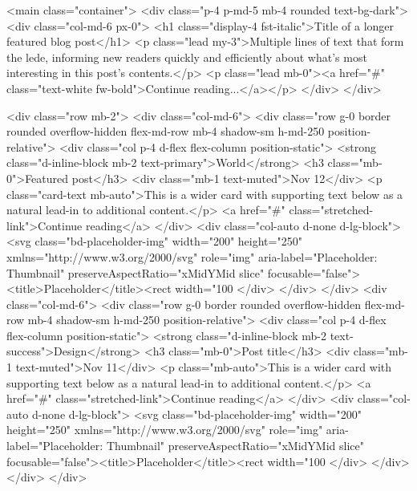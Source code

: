 <main class="container">
  <div class="p-4 p-md-5 mb-4 rounded text-bg-dark">
    <div class="col-md-6 px-0">
      <h1 class="display-4 fst-italic">Title of a longer featured blog post</h1>
      <p class="lead my-3">Multiple lines of text that form the lede, informing new readers quickly and efficiently about what’s most interesting in this post’s contents.</p>
      <p class="lead mb-0"><a href="#" class="text-white fw-bold">Continue reading...</a></p>
    </div>
  </div>

  <div class="row mb-2">
    <div class="col-md-6">
      <div class="row g-0 border rounded overflow-hidden flex-md-row mb-4 shadow-sm h-md-250 position-relative">
        <div class="col p-4 d-flex flex-column position-static">
          <strong class="d-inline-block mb-2 text-primary">World</strong>
          <h3 class="mb-0">Featured post</h3>
          <div class="mb-1 text-muted">Nov 12</div>
          <p class="card-text mb-auto">This is a wider card with supporting text below as a natural lead-in to additional content.</p>
          <a href="#" class="stretched-link">Continue reading</a>
        </div>
        <div class="col-auto d-none d-lg-block">
          <svg class="bd-placeholder-img" width="200" height="250" xmlns="http://www.w3.org/2000/svg" role="img" aria-label="Placeholder: Thumbnail" preserveAspectRatio="xMidYMid slice" focusable="false"><title>Placeholder</title><rect width="100%
        </div>
      </div>
    </div>
    <div class="col-md-6">
      <div class="row g-0 border rounded overflow-hidden flex-md-row mb-4 shadow-sm h-md-250 position-relative">
        <div class="col p-4 d-flex flex-column position-static">
          <strong class="d-inline-block mb-2 text-success">Design</strong>
          <h3 class="mb-0">Post title</h3>
          <div class="mb-1 text-muted">Nov 11</div>
          <p class="mb-auto">This is a wider card with supporting text below as a natural lead-in to additional content.</p>
          <a href="#" class="stretched-link">Continue reading</a>
        </div>
        <div class="col-auto d-none d-lg-block">
          <svg class="bd-placeholder-img" width="200" height="250" xmlns="http://www.w3.org/2000/svg" role="img" aria-label="Placeholder: Thumbnail" preserveAspectRatio="xMidYMid slice" focusable="false"><title>Placeholder</title><rect width="100%
        </div>
      </div>
    </div>
  </div>


